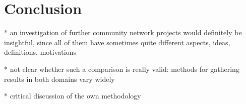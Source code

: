 \section{Conclusion}

* an investigation of further community network projects would definitely be insightful, since all of them have sometimes quite different aspects, ideas, definitions, motivations

* not clear whether such a comparison is really valid: methods for gathering results in both domains vary widely

* critical discussion of the own methodology
